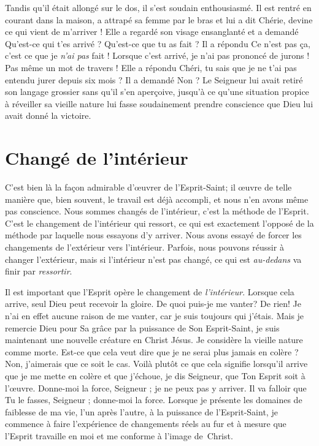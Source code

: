 Tandis qu'il était allongé sur le dos, il s'est soudain enthousiasmé.
 Il est rentré en courant dans la maison, a attrapé sa femme par le bras et lui a dit\frcolon{}
 \Og Chérie, devine ce qui vient de m'arriver ! \Fg{}
 Elle a regardé son visage ensanglanté et a demandé\frcolon{}
 \Og Qu'est-ce qui t'es arrivé ? Qu'est-ce que tu as fait ? \Fg{}
 Il a répondu\frcolon{}
 \Og Ce n'est pas ça, c'est ce que je \emph{n'ai pas} fait !
 Lorsque c'est arrivé, je n'ai pas prononcé de jurons ! Pas même un mot de travers ! \Fg{}
 Elle a répondu\frcolon{}
 \Og Chéri, tu sais que je ne t'ai pas entendu jurer depuis six mois ? \Fg{}
 Il a demandé\frcolon{} \Og Non ? \Fg{}
 Le Seigneur lui avait retiré son langage grossier sans qu'il s'en aperçoive,
 jusqu'à ce qu'une situation propice à réveiller sa vieille nature
 lui fasse soudainement prendre conscience
 que Dieu lui avait donné la victoire.


\section{Chang\'e de l'int\'erieur}

C'est bien là la façon admirable d'œuvrer de l'Esprit-Saint;
 il \oe{}uvre de telle manière que, bien souvent,
 le travail est déjà accompli, et nous n'en avons même pas conscience.
 Nous sommes changés de l'intérieur, c'est la méthode de l'Esprit.
 C'est le changement de l'intérieur qui ressort,
 ce qui est exactement l'opposé de la méthode par laquelle
 nous essayons d'y arriver.
 Nous avons essayé de forcer les changements de l'extérieur
 vers l'intérieur.
 Parfois, nous pouvons réussir à changer l'extérieur,
 mais si l'intérieur n'est pas changé,
 ce qui est \emph{au-dedans} va finir par \emph{ressortir}.

Il est important que l'Esprit opère le changement de \emph{l'intérieur}.
 Lorsque cela arrive, seul Dieu peut recevoir la gloire.
 De quoi puis-je me vanter? De rien!
 Je n'ai en effet aucune raison de me vanter, car je suis toujours qui j'étais.
 Mais je remercie Dieu pour Sa grâce\frcolon{} par la puissance de Son Esprit-Saint,
 je suis maintenant une nouvelle créature en Christ Jésus.
 Je considère la vieille nature comme morte.
 Est-ce que cela veut dire que je ne serai plus jamais en colère ?
 Non, j'aimerais que ce soit le cas.
 Voilà plutôt ce que cela signifie\frcolon{} lorsqu'il arrive que je me mette en colère
 et que j'échoue, je dis\frcolon{}
 \Og Seigneur, que Ton Esprit soit à l'œuvre. Donne-moi la force,
 Seigneur ; je ne peux pas y arriver. Il va falloir que Tu le fasses,
 Seigneur ; donne-moi la force. \Fg{}
 Lorsque je présente les domaines de faiblesse de ma vie, l'un après l'autre,
 à la puissance de l'Esprit-Saint, je commence à faire
 l'expérience  de changements réels au fur et à mesure
 que l'Esprit travaille en moi et me conforme à l'image de~Christ.


